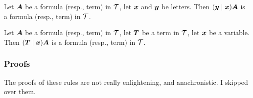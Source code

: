 \begin{cf}\label{cf7}
Let $\boldsymbol{A}$ be a formula (resp., term) in $\mathcal{T}$, let
$\boldsymbol{x}$ and $\boldsymbol{y}$ be letters. Then
$(\boldsymbol{y}\mid\boldsymbol{x})\boldsymbol{A}$ is a formula
(resp., term) in $\mathcal{T}$.
\end{cf}

\begin{cf}\label{cf8}
Let $\boldsymbol{A}$ be a formula (resp., term) in $\mathcal{T}$, let
$\boldsymbol{T}$ be a term in $\mathcal{T}$, let $\boldsymbol{x}$ be
a variable. Then $(\boldsymbol{T}\mid\boldsymbol{x})\boldsymbol{A}$
is a formula (resp., term) in $\mathcal{T}$.
\end{cf}

\subsubsection{Proofs}
The proofs of these rules are not really enlightening, and
anachronistic. I skipped over them.
